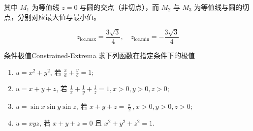 \begin{solution}
    其中 $M_1$ 为等值线 $z=0$ 与圆的交点（非切点），而 $M_2$ 与 $M_3$ 为等值线与圆的切点，分别对应最大值与最小值。

    \begin{equation}
        \boxed{z_{\text{loc.max}} = \frac{3\sqrt{3}}{4}, \quad z_{\text{loc.min}} = -\frac{3\sqrt{3}}{4}}
    \end{equation}
\end{solution}


\begin{problem}{条件极值}{Constrained-Extrema}
    求下列函数在指定条件下的极值
    \begin{enumerate}
        \item $u = x^{2} + y^{2}$, 若 $\frac{x}{a} + \frac{y}{b} = 1$;
        \item $u = x + y + z$, 若 $\frac{1}{x} + \frac{1}{y} + \frac{1}{z} = 1, x > 0, y > 0, z > 0$;
        \item $u = \sin x \sin y \sin z$, 若 $x + y + z = \frac{\uppi}{2}, x > 0, y > 0, z > 0$;
        \item $u = x y z$, 若 $x + y + z = 0$ 且 $x^{2} + y^{2} + z^{2} = 1$.
    \end{enumerate}
\end{problem}

